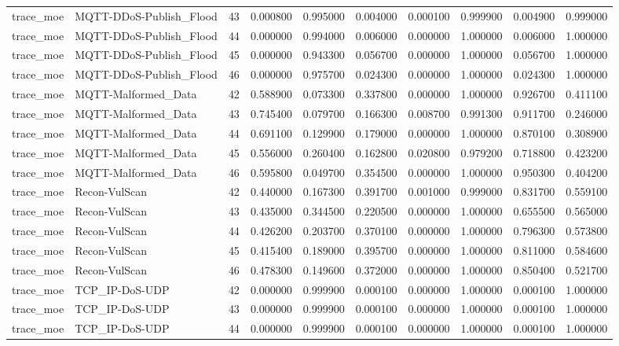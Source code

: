 \begin{table}
\begin{tabular}{llrrrrrrrr}
trace\_moe & MQTT-DDoS-Publish\_Flood & 43 & 0.000800 & 0.995000 & 0.004000 & 0.000100 & 0.999900 & 0.004900 & 0.999000 \\
trace\_moe & MQTT-DDoS-Publish\_Flood & 44 & 0.000000 & 0.994000 & 0.006000 & 0.000000 & 1.000000 & 0.006000 & 1.000000 \\
trace\_moe & MQTT-DDoS-Publish\_Flood & 45 & 0.000000 & 0.943300 & 0.056700 & 0.000000 & 1.000000 & 0.056700 & 1.000000 \\
trace\_moe & MQTT-DDoS-Publish\_Flood & 46 & 0.000000 & 0.975700 & 0.024300 & 0.000000 & 1.000000 & 0.024300 & 1.000000 \\
trace\_moe & MQTT-Malformed\_Data & 42 & 0.588900 & 0.073300 & 0.337800 & 0.000000 & 1.000000 & 0.926700 & 0.411100 \\
trace\_moe & MQTT-Malformed\_Data & 43 & 0.745400 & 0.079700 & 0.166300 & 0.008700 & 0.991300 & 0.911700 & 0.246000 \\
trace\_moe & MQTT-Malformed\_Data & 44 & 0.691100 & 0.129900 & 0.179000 & 0.000000 & 1.000000 & 0.870100 & 0.308900 \\
trace\_moe & MQTT-Malformed\_Data & 45 & 0.556000 & 0.260400 & 0.162800 & 0.020800 & 0.979200 & 0.718800 & 0.423200 \\
trace\_moe & MQTT-Malformed\_Data & 46 & 0.595800 & 0.049700 & 0.354500 & 0.000000 & 1.000000 & 0.950300 & 0.404200 \\
trace\_moe & Recon-VulScan & 42 & 0.440000 & 0.167300 & 0.391700 & 0.001000 & 0.999000 & 0.831700 & 0.559100 \\
trace\_moe & Recon-VulScan & 43 & 0.435000 & 0.344500 & 0.220500 & 0.000000 & 1.000000 & 0.655500 & 0.565000 \\
trace\_moe & Recon-VulScan & 44 & 0.426200 & 0.203700 & 0.370100 & 0.000000 & 1.000000 & 0.796300 & 0.573800 \\
trace\_moe & Recon-VulScan & 45 & 0.415400 & 0.189000 & 0.395700 & 0.000000 & 1.000000 & 0.811000 & 0.584600 \\
trace\_moe & Recon-VulScan & 46 & 0.478300 & 0.149600 & 0.372000 & 0.000000 & 1.000000 & 0.850400 & 0.521700 \\
trace\_moe & TCP\_IP-DoS-UDP & 42 & 0.000000 & 0.999900 & 0.000100 & 0.000000 & 1.000000 & 0.000100 & 1.000000 \\
trace\_moe & TCP\_IP-DoS-UDP & 43 & 0.000000 & 0.999900 & 0.000100 & 0.000000 & 1.000000 & 0.000100 & 1.000000 \\
trace\_moe & TCP\_IP-DoS-UDP & 44 & 0.000000 & 0.999900 & 0.000100 & 0.000000 & 1.000000 & 0.000100 & 1.000000 \\

\end{tabular}
\end{table}
